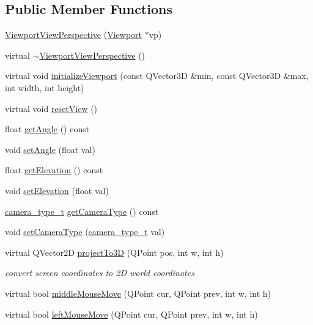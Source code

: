 \subsection*{Public Member Functions}
\begin{DoxyCompactItemize}
\item 
\hyperlink{classShipCAD_1_1ViewportViewPerspective_a670a0691b0d02fadd13bf210026efcf1}{Viewport\+View\+Perspective} (\hyperlink{classShipCAD_1_1Viewport}{Viewport} $\ast$vp)
\item 
virtual \hyperlink{classShipCAD_1_1ViewportViewPerspective_a3424a48490558e39959161ee9b5da692}{$\sim$\+Viewport\+View\+Perspective} ()
\item 
virtual void \hyperlink{classShipCAD_1_1ViewportViewPerspective_af96ca2b448d261206e360b1304510a65}{initialize\+Viewport} (const Q\+Vector3D \&min, const Q\+Vector3D \&max, int width, int height)
\item 
virtual void \hyperlink{classShipCAD_1_1ViewportViewPerspective_ab3cc69a6cdb3271cc9e79ec16aa37a33}{reset\+View} ()
\item 
float \hyperlink{classShipCAD_1_1ViewportViewPerspective_a6d48a61a324740874979d599352bef82}{get\+Angle} () const 
\item 
void \hyperlink{classShipCAD_1_1ViewportViewPerspective_ad6d853a15bc9015d43e4c052471f2cb1}{set\+Angle} (float val)
\item 
float \hyperlink{classShipCAD_1_1ViewportViewPerspective_a4baad3b4ab5a1f3fb7fd2dfa9ac49952}{get\+Elevation} () const 
\item 
void \hyperlink{classShipCAD_1_1ViewportViewPerspective_ad09e4532f81905f9ea90545b0b6d4856}{set\+Elevation} (float val)
\item 
\hyperlink{namespaceShipCAD_a58f51ebd2e66de5e41c2ffd6f434241e}{camera\+\_\+type\+\_\+t} \hyperlink{classShipCAD_1_1ViewportViewPerspective_a76e1128fb2031c44b4d04eecbeace739}{get\+Camera\+Type} () const 
\item 
void \hyperlink{classShipCAD_1_1ViewportViewPerspective_ab1a56bd7cb986e2c3163bcacd201d32d}{set\+Camera\+Type} (\hyperlink{namespaceShipCAD_a58f51ebd2e66de5e41c2ffd6f434241e}{camera\+\_\+type\+\_\+t} val)
\item 
virtual Q\+Vector2D \hyperlink{classShipCAD_1_1ViewportViewPerspective_afc402aace76462bb3b0431cebba6a6a5}{project\+To3D} (Q\+Point pos, int w, int h)
\begin{DoxyCompactList}\small\item\em convert screen coordinates to 2D world coordinates \end{DoxyCompactList}\item 
virtual bool \hyperlink{classShipCAD_1_1ViewportViewPerspective_a1de2fd402609b54c79c2d70390ba4a64}{middle\+Mouse\+Move} (Q\+Point cur, Q\+Point prev, int w, int h)
\item 
virtual bool \hyperlink{classShipCAD_1_1ViewportViewPerspective_a11f5f04a95646a701743804c4d7c1d10}{left\+Mouse\+Move} (Q\+Point cur, Q\+Point prev, int w, int h)
\end{DoxyCompactItemize}

